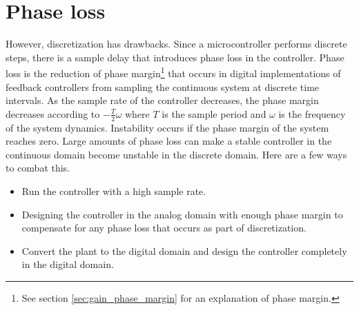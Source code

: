 \section{Phase loss}

However, \gls{discretization} has drawbacks. Since a microcontroller performs
discrete steps, there is a sample delay that introduces phase loss in the
controller. Phase loss is the reduction of \gls{phase margin}\footnote{See
section \ref{sec:gain_phase_margin} for an explanation of phase margin.} that
occurs in digital implementations of feedback controllers from sampling the
continuous \gls{system} at discrete time intervals. As the sample rate of the
controller decreases, the \gls{phase margin} decreases according to
$-\frac{T}{2}\omega$ where $T$ is the sample period and $\omega$ is the
frequency of the \gls{system} dynamics. Instability occurs if the
\gls{phase margin} of the \gls{system} reaches zero. Large amounts of phase loss
can make a stable controller in the continuous domain become unstable in the
discrete domain. Here are a few ways to combat this.

\begin{itemize}
  \item Run the controller with a high sample rate.
  \item Designing the controller in the analog domain with enough
    \gls{phase margin} to compensate for any phase loss that occurs as part of
    \gls{discretization}.
  \item Convert the \gls{plant} to the digital domain and design the controller
    completely in the digital domain.
\end{itemize}
